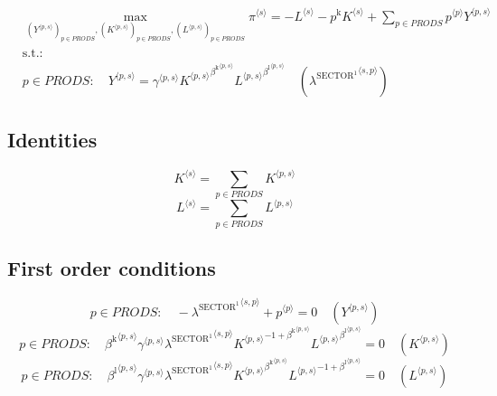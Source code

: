 \begin{align}
&\max_{\left({Y}^{\langle p,s\rangle}\right)_{p\in {P\!R\!O\!D\!S}}, \left({K}^{\langle p,s\rangle}\right)_{p\in {P\!R\!O\!D\!S}}, \left({L}^{\langle p,s\rangle}\right)_{p\in {P\!R\!O\!D\!S}}
} {\pi}^{\langle s\rangle} = -{L}^{\langle s\rangle} - {p^{\mathrm{k}}} {{K}^{\langle s\rangle}} + \sum_{p\in {P\!R\!O\!D\!S}} {{p}^{\langle p\rangle}} {{Y}^{\langle p,s\rangle}}\\
&\mathrm{s.t.:}\nonumber\\
& p\in {P\!R\!O\!D\!S}\colon\quad {Y}^{\langle p,s\rangle} = {{\gamma}^{\langle p,s\rangle}} {{{K}^{\langle p,s\rangle}}^{{\beta^{\mathrm{k}}}^{\langle p,s\rangle}}} {{{L}^{\langle p,s\rangle}}^{{\beta^{\mathrm{l}}}^{\langle p,s\rangle}}} \quad \left({\lambda^{\mathrm{SECTOR}^{\mathrm{1}}}}^{\langle s,p\rangle}\right)
\end{align}


\subsection{Identities}

\begin{equation}
{K}^{\langle s\rangle} = \sum_{p\in {P\!R\!O\!D\!S}} {K}^{\langle p,s\rangle}
\end{equation}
\begin{equation}
{L}^{\langle s\rangle} = \sum_{p\in {P\!R\!O\!D\!S}} {L}^{\langle p,s\rangle}
\end{equation}


\subsection{First order conditions}

\begin{equation}
p\in {P\!R\!O\!D\!S}\colon\quad -{\lambda^{\mathrm{SECTOR}^{\mathrm{1}}}}^{\langle s,p\rangle} + {p}^{\langle p\rangle} = 0
 \quad \left({Y}^{\langle p,s\rangle}\right)
\end{equation}
\begin{equation}
p\in {P\!R\!O\!D\!S}\colon\quad {{\beta^{\mathrm{k}}}^{\langle p,s\rangle}} {{\gamma}^{\langle p,s\rangle}} {{\lambda^{\mathrm{SECTOR}^{\mathrm{1}}}}^{\langle s,p\rangle}} {{{K}^{\langle p,s\rangle}}^{-1 + {\beta^{\mathrm{k}}}^{\langle p,s\rangle}}} {{{L}^{\langle p,s\rangle}}^{{\beta^{\mathrm{l}}}^{\langle p,s\rangle}}} = 0
 \quad \left({K}^{\langle p,s\rangle}\right)
\end{equation}
\begin{equation}
p\in {P\!R\!O\!D\!S}\colon\quad {{\beta^{\mathrm{l}}}^{\langle p,s\rangle}} {{\gamma}^{\langle p,s\rangle}} {{\lambda^{\mathrm{SECTOR}^{\mathrm{1}}}}^{\langle s,p\rangle}} {{{K}^{\langle p,s\rangle}}^{{\beta^{\mathrm{k}}}^{\langle p,s\rangle}}} {{{L}^{\langle p,s\rangle}}^{-1 + {\beta^{\mathrm{l}}}^{\langle p,s\rangle}}} = 0
 \quad \left({L}^{\langle p,s\rangle}\right)
\end{equation}




